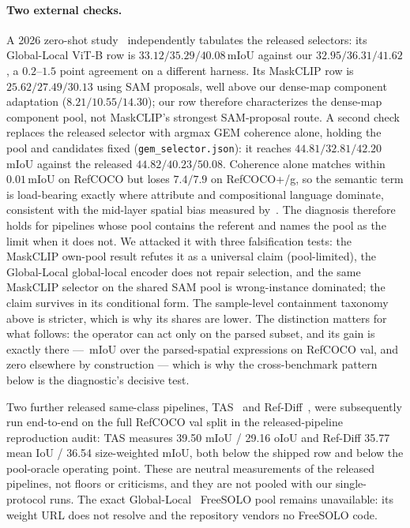\paragraph{Two external checks.}
A 2026 zero-shot study~\cite{earlygrounding2026} independently tabulates the
released selectors: its Global-Local ViT-B row is $33.12/35.29/40.08$\,mIoU
against our $32.95/36.31/41.62$, a $0.2$--$1.5$ point agreement on a different
harness. Its MaskCLIP row is $25.62/27.49/30.13$ using SAM proposals, well
above our dense-map component adaptation ($8.21/10.55/14.30$); our row
therefore characterizes the dense-map component pool, not MaskCLIP's
strongest SAM-proposal route. A second check replaces the released selector
with argmax GEM coherence alone, holding the pool and candidates fixed
(\texttt{gem\_selector.json}): it reaches $44.81/32.81/42.20$\,mIoU against
the released $44.82/40.23/50.08$. Coherence alone matches within
$0.01$\,mIoU on RefCOCO but loses $7.4/7.9$ on RefCOCO+/g, so the semantic
term is load-bearing exactly where attribute and compositional language
dominate, consistent with the mid-layer spatial bias measured
by~\cite{blindposition2025}. The diagnosis therefore holds for pipelines
whose pool contains the referent and names the pool as the limit when it does
not. We attacked it with three falsification tests: the MaskCLIP own-pool
result refutes it as a universal claim (pool-limited), the Global-Local
global-local encoder does not repair selection, and the same MaskCLIP selector
on the shared SAM pool is wrong-instance dominated; the claim survives in its
conditional form. The sample-level containment taxonomy above is stricter,
which is why its shares are lower. The distinction matters for what follows: the operator can act
only on the parsed subset, and its gain is exactly there ---
\operatorOnSpatial\,mIoU over the \strataSpatialN{} parsed-spatial
expressions on RefCOCO val, and zero elsewhere by construction --- which is
why the cross-benchmark pattern below is the diagnostic's decisive test.

Two further released same-class pipelines, TAS~\cite{shu2023tas} and
Ref-Diff~\cite{ni2023refdiff}, were subsequently run end-to-end on the full
RefCOCO val split in the released-pipeline reproduction audit: TAS measures
39.50 mIoU / 29.16 oIoU and Ref-Diff 35.77 mean IoU / 36.54 size-weighted
mIoU, both below the shipped row and below the pool-oracle operating point.
These are neutral measurements of the released pipelines, not floors or
criticisms, and they are not pooled with our single-protocol runs. The exact
Global-Local~\cite{yu2023global} FreeSOLO pool remains unavailable: its
weight URL does not resolve and the repository vendors no FreeSOLO code.

